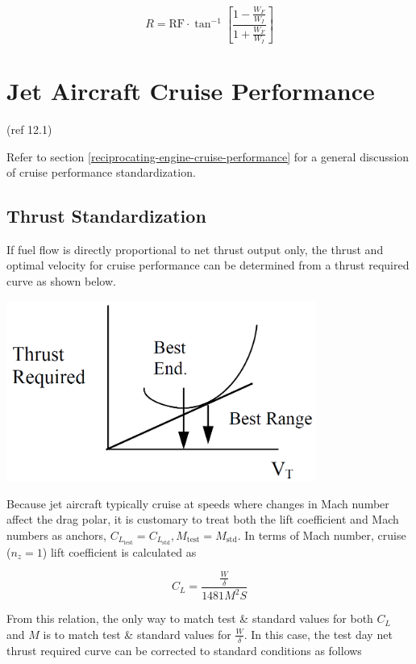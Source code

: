 \documentclass[
]{book}
\begin{document}
\[
R = \mathrm{RF} \cdot \tan^{-1} \left[ \frac{1 - \frac{W_F}{W_I}}{1 + \frac{W_F}{W_I}} \right]
\label{eq:const-as-alt-rng}
\]

\hypertarget{jet-aircraft-cruise-performance}{%
\section{Jet Aircraft Cruise Performance}\label{jet-aircraft-cruise-performance}}

(ref 12.1)

Refer to section \ref{reciprocating-engine-cruise-performance} for a general
discussion of cruise performance standardization.

\hypertarget{thrust-standardization}{%
\subsection{Thrust Standardization}\label{thrust-standardization}}

If fuel flow is directly proportional to net thrust output only, the thrust and
optimal velocity for cruise performance can be determined from a thrust required
curve as shown below.

\includegraphics[width=4in,height=\textheight]{media/12/thrust-speed-curve.png}

Because jet aircraft typically cruise at speeds where changes in Mach number
affect the drag polar, it is customary to treat both the lift coefficient and
Mach numbers as anchors, \(C_{L_{\text{test}}} = C_{L_{\text{std}}}, M_{\text{test}} = M_{\text{std}}\).
In terms of Mach number, cruise (\(n_z = 1\)) lift coefficient is calculated as

\[
C_L = \frac{ \frac{W}{\delta} }{1481 M^2 S}
\label{eq:cruise-cl-in-mach}
\]

From this relation, the only way to match test \& standard values for both
\(C_L\) and \(M\) is to match test \& standard values for \(\frac{W}{\delta}\).
In this case, the test day net thrust required curve can be corrected to
standard conditions as follows
\end{document}
